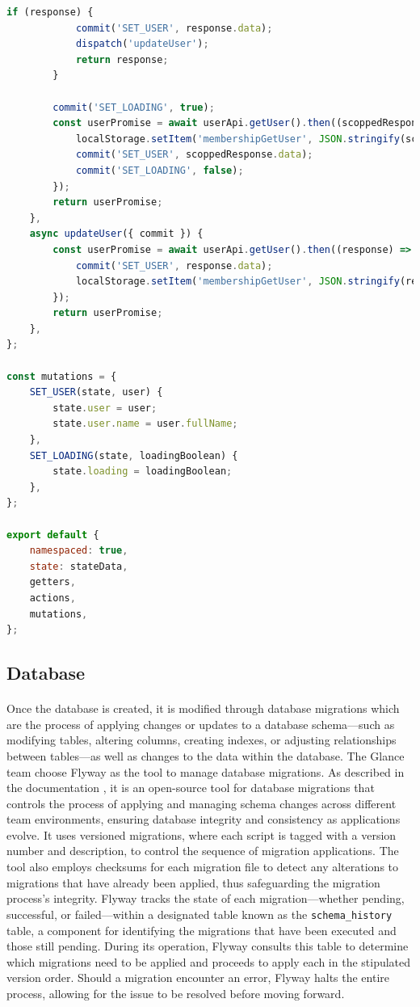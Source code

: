 \begin{lstlisting}[language=javascript, caption={Vuex User Store Module.}, label=lst:vuex_user]
        if (response) {
            commit('SET_USER', response.data);
            dispatch('updateUser');
            return response;
        }

        commit('SET_LOADING', true);
        const userPromise = await userApi.getUser().then((scoppedResponse) => {
            localStorage.setItem('membershipGetUser', JSON.stringify(scoppedResponse));
            commit('SET_USER', scoppedResponse.data);
            commit('SET_LOADING', false);
        });
        return userPromise;
    },
    async updateUser({ commit }) {
        const userPromise = await userApi.getUser().then((response) => {
            commit('SET_USER', response.data);
            localStorage.setItem('membershipGetUser', JSON.stringify(response));
        });
        return userPromise;
    },
};

const mutations = {
    SET_USER(state, user) {
        state.user = user;
        state.user.name = user.fullName;
    },
    SET_LOADING(state, loadingBoolean) {
        state.loading = loadingBoolean;
    },
};

export default {
    namespaced: true,
    state: stateData,
    getters,
    actions,
    mutations,
};
\end{lstlisting}


\subsection{Database} 

\paragraph{} Once the database is created, it is modified through database migrations which are the process of applying changes or updates to a database schema—such as modifying tables, altering columns, creating indexes, or adjusting relationships between tables—as well as changes to the data within the database. The Glance team choose Flyway as the tool to manage database migrations. As described in the documentation \cite{FlywayDocumentation2024}, it is an open-source tool for database migrations that controls the process of applying and managing schema changes across different team environments, ensuring database integrity and consistency as applications evolve. It uses versioned migrations, where each script is tagged with a version number and description, to control the sequence of migration applications. The tool also employs checksums for each migration file to detect any alterations to migrations that have already been applied, thus safeguarding the migration process's integrity. Flyway tracks the state of each migration—whether pending, successful, or failed—within a designated table known as the \verb|schema_history| table, a component for identifying the migrations that have been executed and those still pending. During its operation, Flyway consults this table to determine which migrations need to be applied and proceeds to apply each in the stipulated version order. Should a migration encounter an error, Flyway halts the entire process, allowing for the issue to be resolved before moving forward.

